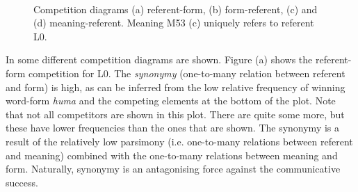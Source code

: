 \begin{figure}[t]
\centering
{}
\\
\caption{Competition diagrams (a) referent-form, (b) form-referent, (c) and (d) meaning-referent. Meaning M53 (c) uniquely refers to referent L0.}
\label{f:st:comp}
\end{figure}

In  some different competition diagrams are shown. Figure (a) shows the referent-form competition for L0. The {\em synonymy} (one-to-many relation between referent and form) is high, as can be inferred from the low relative frequency of winning word-form {\it huma} and the competing elements at the bottom of the plot. Note that not all competitors are shown in this plot. There are quite some more, but these have lower frequencies than the ones that are shown. The synonymy is a result of the relatively low parsimony (i.e. one-to-many relations between referent and meaning) combined with the one-to-many relations between meaning and form. Naturally, synonymy is an antagonising force against the communicative success.

